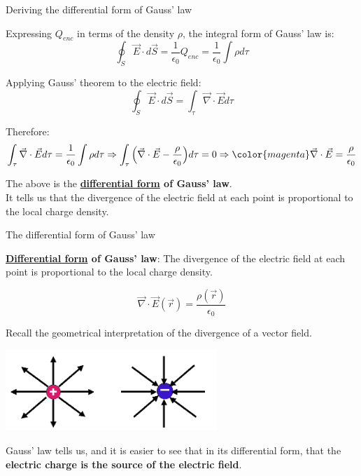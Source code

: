 %
%
%

\begin{frame}{Deriving the differential form of Gauss' law}

Expressing $Q_{enc}$ in terms of the density $\rho$,
the integral form of Gauss' law is:
\begin{equation*}
   \oint_{S} \vec{E} \cdot d\vec{S} = \frac{1}{\epsilon_0} Q_{enc} =  \frac{1}{\epsilon_0} \int \rho d\tau
\end{equation*}

Applying Gauss' theorem to the electric field:
\begin{equation*}
   \oint_{S} \vec{E} \cdot d\vec{S} = \int_{\tau} \vec{\nabla} \cdot \vec{E} d\tau
\end{equation*}

Therefore:
\begin{equation*}
  \int_{\tau} \vec{\nabla} \cdot \vec{E} d\tau = \frac{1}{\epsilon_0} \int \rho d\tau \Rightarrow
  \int_{\tau} \Big( \vec{\nabla} \cdot \vec{E} - \frac{\rho}{\epsilon_0} \Big) d\tau = 0 \Rightarrow
  {\color{magenta} \vec{\nabla} \cdot \vec{E} = \frac{\rho}{\epsilon_0}}
\end{equation*}

The above is the {\bf \underline{differential form} of Gauss' law}.\\
It tells us that the divergence of the electric field at each point is proportional to the local charge density.

\end{frame}


%
%
%

\begin{frame}{The differential form of Gauss' law}

{\bf \underline{Differential form} of Gauss' law}:
The divergence of the electric field at each point is proportional to the local charge density.

\begin{equation*}
  \vec{\nabla} \cdot \vec{E}(\vec{r}) = \frac{\rho(\vec{r})}{\epsilon_0}
\end{equation*}

Recall the geometrical interpretation of the divergence of a vector field.\\
\begin{center}
  \includegraphics[width=0.60\textwidth]{./images/schematics/electric_field_lines_pos_and_neg_point_charges_1.png}\\
\end{center}

Gauss' law tells us, and it is easier to see that in its differential form, that
the {\bf electric charge is the source of the electric field}.

\end{frame}

